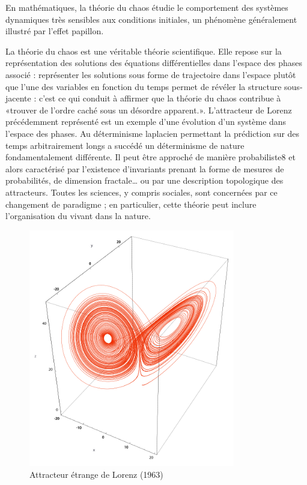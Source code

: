 \documentclass[10pt,a4paper]{article}
\begin{document}
En mathématiques, la théorie du chaos étudie le comportement des systèmes dynamiques très sensibles aux conditions initiales, un phénomène généralement illustré par l'effet papillon.\vspace{0.40cm}

La théorie du chaos est une véritable théorie scientifique. Elle repose sur la représentation des solutions des équations différentielles dans l'espace des phases associé : représenter les solutions sous forme de trajectoire dans l'espace plutôt que l'une des variables en fonction du temps permet de révéler la structure sous-jacente : c'est ce qui conduit à affirmer que la théorie du chaos contribue à «trouver de l'ordre caché sous un désordre apparent.». L'attracteur de Lorenz précédemment représenté est un exemple d'une évolution d'un système dans l'espace des phases. Au déterminisme laplacien permettant la prédiction sur des temps arbitrairement longs a succédé un déterminisme de nature fondamentalement différente. Il peut être approché de manière probabiliste8 et alors caractérisé par l'existence d'invariants prenant la forme de mesures de probabilités, de dimension fractale… ou par une description topologique des attracteurs. Toutes les sciences, y compris sociales, sont concernées par ce changement de paradigme ; en particulier, cette théorie peut inclure l'organisation du vivant dans la nature.

\begin{figure}
\includegraphics[width=9cm]{Lorenz_attractor_boxed.png}
\caption{Attracteur étrange de Lorenz (1963)}
\end{figure}
\newpage 
\end{document}
